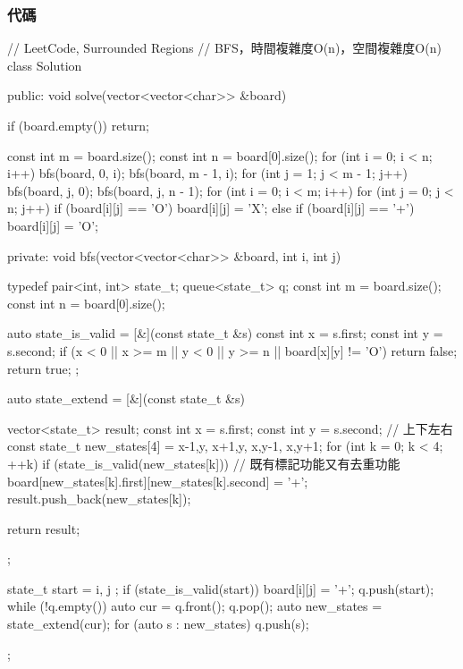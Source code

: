 \subsubsection{代碼}
\begin{Code}
// LeetCode, Surrounded Regions
// BFS，時間複雜度O(n)，空間複雜度O(n)
class Solution {
public:
    void solve(vector<vector<char>> &board) {
        if (board.empty()) return;

        const int m = board.size();
        const int n = board[0].size();
        for (int i = 0; i < n; i++) {
            bfs(board, 0, i);
            bfs(board, m - 1, i);
        }
        for (int j = 1; j < m - 1; j++) {
            bfs(board, j, 0);
            bfs(board, j, n - 1);
        }
        for (int i = 0; i < m; i++)
            for (int j = 0; j < n; j++)
                if (board[i][j] == 'O')
                    board[i][j] = 'X';
                else if (board[i][j] == '+')
                    board[i][j] = 'O';
    }
private:
    void bfs(vector<vector<char>> &board, int i, int j) {
        typedef pair<int, int> state_t;
        queue<state_t> q;
        const int m = board.size();
        const int n = board[0].size();

        auto state_is_valid = [&](const state_t &s) {
            const int x = s.first;
            const int y = s.second;
            if (x < 0 || x >= m || y < 0 || y >= n || board[x][y] != 'O')
                return false;
            return true;
        };

        auto state_extend = [&](const state_t &s) {
            vector<state_t> result;
            const int x = s.first;
            const int y = s.second;
            // 上下左右
            const state_t new_states[4] = {{x-1,y}, {x+1,y},
                    {x,y-1}, {x,y+1}};
            for (int k = 0; k < 4;  ++k) {
                if (state_is_valid(new_states[k])) {
                    // 既有標記功能又有去重功能
                    board[new_states[k].first][new_states[k].second] = '+';
                    result.push_back(new_states[k]);
                }
            }

            return result;
        };

        state_t start = { i, j };
        if (state_is_valid(start)) {
            board[i][j] = '+';
            q.push(start);
        }
        while (!q.empty()) {
            auto cur = q.front();
            q.pop();
            auto new_states = state_extend(cur);
            for (auto s : new_states) q.push(s);
        }
    }
};
\end{Code}



